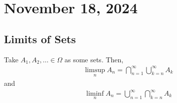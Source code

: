 \section{November 18, 2024}

\subsection{Limits of Sets}
\begin{definition}
    Take $A_1, A_2, \ldots \in \Omega$ as some sets. Then,
    \begin{align}
        \limsup_n A_n = \bigcap_{n=1}^\infty \bigcup_{k=n}^\infty A_k
    \end{align}
    and
    \begin{align}
        \liminf_n A_n = \bigcup_{n=1}^\infty \bigcap_{k=n}^\infty A_k
    \end{align}
\end{definition}

